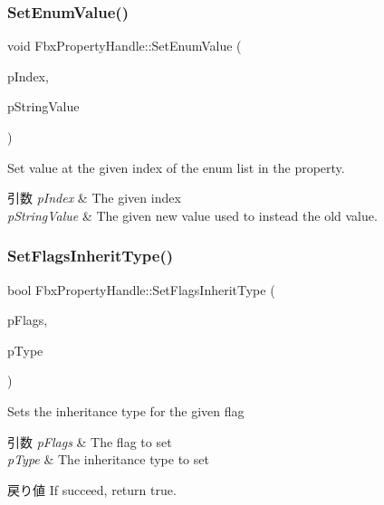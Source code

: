 \subsubsection{\texorpdfstring{Set\+Enum\+Value()}{SetEnumValue()}}
{\footnotesize\ttfamily void Fbx\+Property\+Handle\+::\+Set\+Enum\+Value (\begin{DoxyParamCaption}\item[{int}]{p\+Index,  }\item[{const char $\ast$}]{p\+String\+Value }\end{DoxyParamCaption})}

Set value at the given index of the enum list in the property. 
\begin{DoxyParams}{引数}
{\em p\+Index} & The given index \\
\hline
{\em p\+String\+Value} & The given new value used to instead the old value. \\
\hline
\end{DoxyParams}
\mbox{\label{class_fbx_property_handle_af26f5ca742328a6894bd89ae80ef9c86}} 
\subsubsection{\texorpdfstring{Set\+Flags\+Inherit\+Type()}{SetFlagsInheritType()}}
{\footnotesize\ttfamily bool Fbx\+Property\+Handle\+::\+Set\+Flags\+Inherit\+Type (\begin{DoxyParamCaption}\item[{\hyperlink{class_fbx_property_flags_afabfa7e0949aac8a7dcdf8a141867e99}{Fbx\+Property\+Flags\+::\+E\+Flags}}]{p\+Flags,  }\item[{\hyperlink{class_fbx_property_flags_ae3b667a4fcac4b827fa186a698fec2f8}{Fbx\+Property\+Flags\+::\+E\+Inherit\+Type}}]{p\+Type }\end{DoxyParamCaption})}

Sets the inheritance type for the given flag 
\begin{DoxyParams}{引数}
{\em p\+Flags} & The flag to set \\
\hline
{\em p\+Type} & The inheritance type to set \\
\hline
\end{DoxyParams}
\begin{DoxyReturn}{戻り値}
If succeed, return true. 
\end{DoxyReturn}
\mbox{\label{class_fbx_property_handle_a501ee2ee91a27619728afeb7d69b5936}} 
